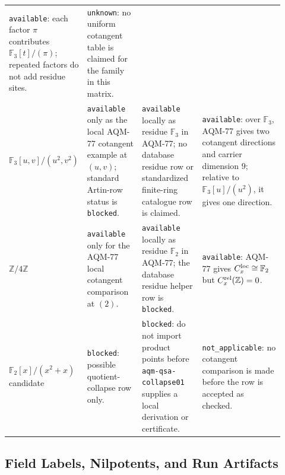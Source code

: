 \begin{center}
\begin{tabular}{p{0.20\linewidth}p{0.20\linewidth}p{0.22\linewidth}p{0.30\linewidth}}
\texttt{available}: each factor \(\pi\) contributes
\(\mathbb F_3[t]/(\pi)\); repeated factors do not add residue sites. &
\texttt{unknown}: no uniform cotangent table is claimed for the family in
this matrix. \\
\addlinespace
\(\mathbb F_3[u,v]/(u^2,v^2)\) &
\texttt{available} only as the local AQM-77 cotangent example at
\((u,v)\); standard Artin-row status is \texttt{blocked}. &
\texttt{available} locally as residue \(\mathbb F_3\) in AQM-77; no
database residue row or standardized finite-ring catalogue row is claimed. &
\texttt{available}: over \(\mathbb F_3\), AQM-77 gives two cotangent
directions and carrier dimension \(9\); relative to
\(\mathbb F_3[u]/(u^2)\), it gives one direction. \\
\addlinespace
\(\mathbb Z/4\mathbb Z\) &
\texttt{available} only for the AQM-77 local cotangent comparison at
\((2)\). &
\texttt{available} locally as residue \(\mathbb F_2\) in AQM-77; the database
residue helper row is \texttt{blocked}. &
\texttt{available}: AQM-77 gives
\(C_x^{\rm loc}\cong\mathbb F_2\) but
\(C_x^{\rm rel}(\mathbb Z)=0\). \\
\addlinespace
\(\mathbb F_2[x]/(x^2+x)\) candidate &
\texttt{blocked}: possible quotient-collapse row only. &
\texttt{blocked}: do not import product points before
\texttt{aqm-qsa-collapse01} supplies a local derivation or certificate. &
\texttt{not\_applicable}: no cotangent comparison is made before the row is
accepted as checked. \\
\bottomrule
\end{tabular}
\end{center}

\subsection{Field Labels, Nilpotents, and Run Artifacts}

